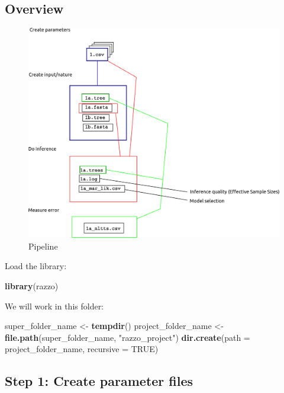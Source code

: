 \documentclass[]{article}
\newenvironment{Shaded}{\begin{snugshade}}{\end{snugshade}}
\newcommand{\KeywordTok}[1]{\textcolor[rgb]{0.13,0.29,0.53}{\textbf{#1}}}
\newcommand{\DataTypeTok}[1]{\textcolor[rgb]{0.13,0.29,0.53}{#1}}
\newcommand{\StringTok}[1]{\textcolor[rgb]{0.31,0.60,0.02}{#1}}
\newcommand{\OtherTok}[1]{\textcolor[rgb]{0.56,0.35,0.01}{#1}}
\newcommand{\NormalTok}[1]{#1}
\begin{document}
\subsection{Overview}\label{overview}

\begin{figure}
\centering
\includegraphics{pipeline.png}
\caption{Pipeline}
\end{figure}

Load the library:

\begin{Shaded}
\begin{Highlighting}[]
\KeywordTok{library}\NormalTok{(razzo)}
\end{Highlighting}
\end{Shaded}

We will work in this folder:

\begin{Shaded}
\begin{Highlighting}[]
\NormalTok{super_folder_name <-}\StringTok{ }\KeywordTok{tempdir}\NormalTok{()}
\NormalTok{project_folder_name <-}\StringTok{ }\KeywordTok{file.path}\NormalTok{(super_folder_name, }\StringTok{"razzo_project"}\NormalTok{) }
\KeywordTok{dir.create}\NormalTok{(}\DataTypeTok{path =}\NormalTok{ project_folder_name, }\DataTypeTok{recursive =} \OtherTok{TRUE}\NormalTok{)}
\end{Highlighting}
\end{Shaded}

\subsection{Step 1: Create parameter
files}\label{step-1-create-parameter-files}
\end{document}
